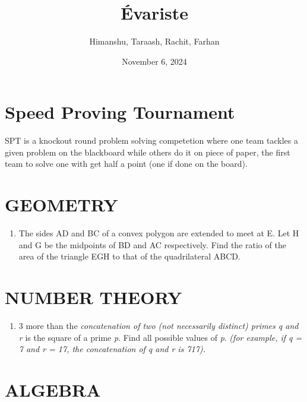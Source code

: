 \documentclass[12pt, letterpaper]{article}
\title{\vspace{-2cm}Évariste} %
\author{Himanshu, Taraash, Rachit, Farhan}
\date{November 6, 2024}
\begin{document}
\maketitle

\section*{Speed Proving Tournament}
SPT is a knockout round problem solving competetion where one team tackles a given problem on the blackboard while others do it on piece of paper, the first team to solve one with get half a point (one if done on the board).


\section{GEOMETRY}
\begin{enumerate}
        \item The sides AD and BC of a convex polygon are extended to meet at E. Let H and G be the midpoints of BD and AC respectively. Find the ratio of the area of the triangle EGH to that of the quadrilateral ABCD.
    
\end{enumerate}

\section{NUMBER THEORY}
\begin{enumerate}
    \item 3 more than the \emph{concatenation of two \emph{(not necessarily distinct) primes }q and r} is the square of a prime \emph{p}. Find all possible values of \emph{p}. \emph{(for example, if q = 7 and r = 17, the concatenation of q and r is 717).}
\end{enumerate}


\section{ALGEBRA}
    
\end{document}
